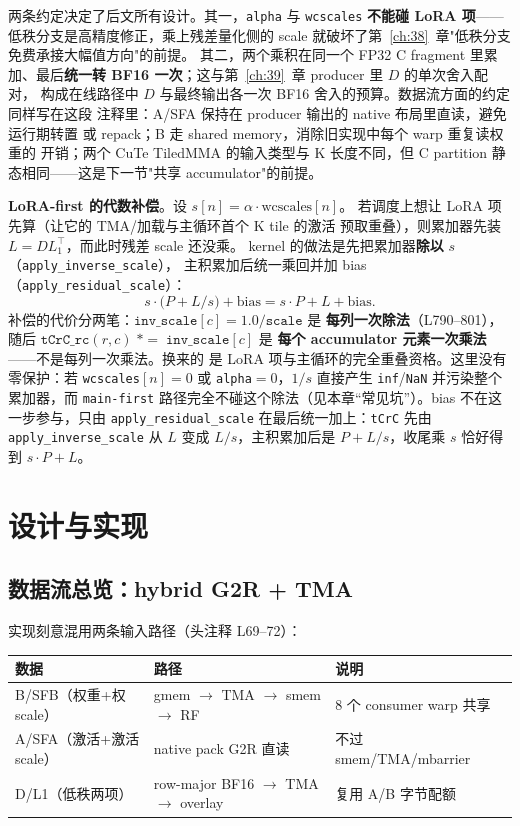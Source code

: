 两条约定决定了后文所有设计。其一，\texttt{alpha} 与 \texttt{wcscales}
\textbf{不能碰 LoRA 项}——低秩分支是高精度修正，乘上残差量化侧的
scale 就破坏了第~\ref{ch:38}~章"低秩分支免费承接大幅值方向"的前提。
其二，两个乘积在同一个 FP32 C fragment 里累加、最后\textbf{统一转
BF16 一次}；这与第~\ref{ch:39}~章 producer 里 $D$ 的单次舍入配对，
构成在线路径中 $D$ 与最终输出各一次 BF16 舍入的预算。数据流方面的约定同样写在这段
注释里：A/SFA 保持在 producer 输出的 native 布局里直读，避免运行期转置
或 repack；B 走 shared memory，消除旧实现中每个 warp 重复读权重的
开销；两个 CuTe TiledMMA 的输入类型与 K 长度不同，但 C partition
静态相同——这是下一节"共享 accumulator"的前提。

\textbf{LoRA-first 的代数补偿}。设 $s[n]=\alpha\cdot\mathrm{wcscales}[n]$。
若调度上想让 LoRA 项先算（让它的 TMA/加载与主循环首个 K tile 的激活
预取重叠），则累加器先装 $L=DL_1^{\top}$，而此时残差 scale 还没乘。
kernel 的做法是先把累加器\textbf{除以} $s$（\texttt{apply\_inverse\_scale}），
主积累加后统一乘回并加 bias（\texttt{apply\_residual\_scale}）：
\begin{equation}
  s\cdot\bigl(P + L/s\bigr) + \mathrm{bias} = s\cdot P + L + \mathrm{bias}.
  \label{eq:40-lorafirst}
\end{equation}
补偿的代价分两笔：$\texttt{inv\_scale}[c]=1.0/\texttt{scale}$ 是
\textbf{每列一次除法}（L790--801），随后
$\texttt{tCrC\_rc}(r,c)\;\texttt{*}=\;\texttt{inv\_scale}[c]$ 是
\textbf{每个 accumulator 元素一次乘法}——不是每列一次乘法。换来的
是 LoRA 项与主循环的完全重叠资格。这里没有零保护：若
\texttt{wcscales}$[n]=0$ 或 \texttt{alpha}$=0$，$1/s$ 直接产生
\texttt{inf}/\texttt{NaN} 并污染整个累加器，而 \texttt{main-first}
路径完全不碰这个除法（见本章“常见坑”）。bias 不在这一步参与，只由
\texttt{apply\_residual\_scale} 在最后统一加上：\texttt{tCrC} 先由
\texttt{apply\_inverse\_scale} 从 $L$ 变成 $L/s$，主积累加后是
$P+L/s$，收尾乘 $s$ 恰好得到 $s\cdot P+L$。

\section{设计与实现}

\subsection{数据流总览：hybrid G2R + TMA}

实现刻意混用两条输入路径（头注释 L69--72）：
\begin{center}\small
\begin{tabular}{@{}llll@{}}
\toprule
数据 & 路径 & 说明 \\
\midrule
B/SFB（权重+权 scale） & gmem $\to$ TMA $\to$ smem $\to$ RF & 8 个 consumer warp 共享 \\
A/SFA（激活+激活 scale） & native pack G2R 直读 & 不过 smem/TMA/mbarrier \\
D/L1（低秩两项） & row-major BF16 $\to$ TMA $\to$ overlay & 复用 A/B 字节配额 \\
\bottomrule
\end{tabular}
\end{center}


